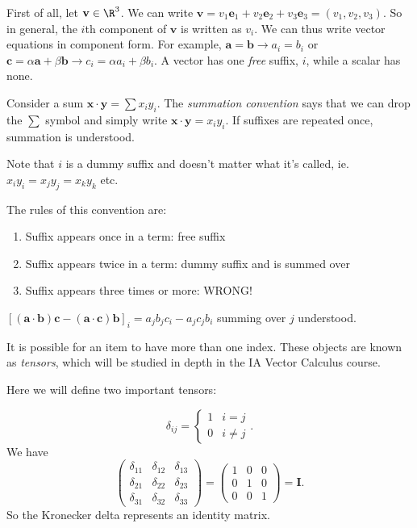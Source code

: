 \documentclass[a4paper]{article}
\begin{document}
First of all, let $\mathbf{v}\in \R^3$. We can write $\mathbf{v} = v_1\mathbf{e}_1 + v_2\mathbf{e}_2 + v_3\mathbf{e}_3 = (v_1, v_2, v_3)$. So in general, the $i$th component of $\mathbf{v}$ is written as $v_i$. We can thus write vector equations in component form. For example, $\mathbf{a} = \mathbf{b} \rightarrow a_i = b_i$ or $\mathbf{c}=\alpha\mathbf{a} + \beta\mathbf{b} \rightarrow c_i = \alpha a_i + \beta b_i$. A vector has one \emph{free} suffix, $i$, while a scalar has none.

\begin{notation}
  Consider a sum $\mathbf{x}\cdot \mathbf{y} = \sum x_i y_i$. The \emph{summation convention} says that we can drop the $\sum$ symbol and simply write $\mathbf{x}\cdot \mathbf{y} = x_i y_i$. If suffixes are repeated once, summation is understood.

  Note that $i$ is a dummy suffix and doesn't matter what it's called, ie. $x_iy_i = x_jy_j = x_k y_k$ etc.

  The rules of this convention are:
  \begin{enumerate}
    \item Suffix appears once in a term: free suffix
    \item Suffix appears twice in a term: dummy suffix and is summed over
    \item Suffix appears three times or more: WRONG!
  \end{enumerate}
\end{notation}

\begin{eg}
  $[\mathbf{(a\cdot b)c - (a \cdot c)b}]_i = a_jb_jc_i - a_jc_jb_i$ summing over $j$ understood.
\end{eg}

It is possible for an item to have more than one index. These objects are known as \emph{tensors}, which will be studied in depth in the IA Vector Calculus course.

Here we will define two important tensors:
\begin{defi}\leavevmode
  \[
    \delta_{ij} =
    \begin{cases}
      1 & i = j\\
      0 & i\not=j
    \end{cases}.
  \]
  We have
  \[
    \begin{pmatrix}
      \delta_{11} & \delta_{12} & \delta_{13}\\
      \delta_{21} & \delta_{22} & \delta_{23}\\
      \delta_{31} & \delta_{32} & \delta_{33}
    \end{pmatrix} =
    \begin{pmatrix}
      1 & 0 & 0\\
      0 & 1 & 0\\
      0 & 0 & 1
    \end{pmatrix}
    = \mathbf{I}.
  \]
  So the Kronecker delta represents an identity matrix.
\end{defi}
\end{document}
